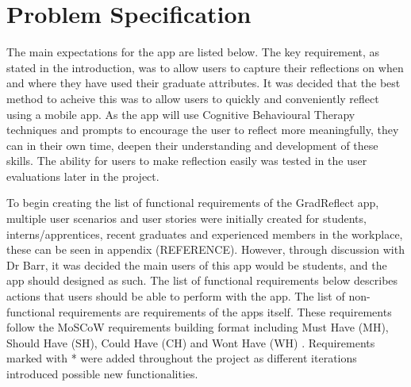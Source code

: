 \documentclass{l4proj}
\begin{document}
\section{Problem Specification}

The main expectations for the app are listed below. The key requirement, as stated in the introduction, was to allow users to capture their reflections on when and where they have used their graduate attributes. It was decided that the best method to acheive this was to allow users to quickly and conveniently reflect using a mobile app. As the app will use Cognitive Behavioural Therapy techniques and prompts to encourage the user to reflect more meaningfully, they can in their own time, deepen their understanding and development of these skills. The ability for users to make reflection easily was tested in the user evaluations later in the project. 

To begin creating the list of functional requirements of the GradReflect app, multiple user scenarios and user stories were initially created for students, interns/apprentices, recent graduates and experienced members in the workplace, these can be seen in appendix (REFERENCE). However, through discussion with Dr Barr, it was decided the main users of this app would be students, and the app should designed as such. The list of functional requirements below describes actions that users should be able to perform with the app. The list of non-functional requirements are requirements of the apps itself. These requirements follow the MoSCoW requirements building format including Must Have (MH), Should Have (SH), Could Have (CH) and Wont Have (WH) \citep{consortium_chapter_2014}. Requirements marked with * were added throughout the project as different iterations introduced possible new functionalities. 
\end{document}
